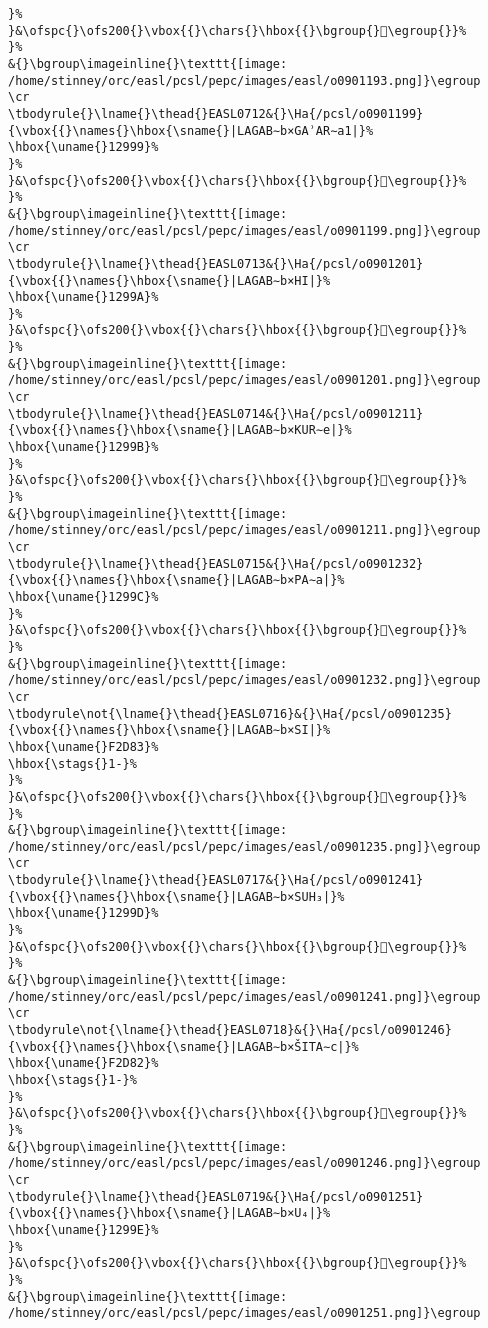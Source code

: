 \begin{verbatim}
}%
}&\ofspc{}\ofs200{}\vbox{{}\chars{}\hbox{{}\bgroup{}𒦘\egroup{}}%
}%
&{}\bgroup\imageinline{}\texttt{[image: /home/stinney/orc/easl/pcsl/pepc/images/easl/o0901193.png]}\egroup
\cr
\tbodyrule{}\lname{}\thead{}EASL0712&{}\Ha{/pcsl/o0901199}{\vbox{{}\names{}\hbox{\sname{}|LAGAB∼b×GAʾAR∼a1|}%
\hbox{\uname{}12999}%
}%
}&\ofspc{}\ofs200{}\vbox{{}\chars{}\hbox{{}\bgroup{}𒦙\egroup{}}%
}%
&{}\bgroup\imageinline{}\texttt{[image: /home/stinney/orc/easl/pcsl/pepc/images/easl/o0901199.png]}\egroup
\cr
\tbodyrule{}\lname{}\thead{}EASL0713&{}\Ha{/pcsl/o0901201}{\vbox{{}\names{}\hbox{\sname{}|LAGAB∼b×HI|}%
\hbox{\uname{}1299A}%
}%
}&\ofspc{}\ofs200{}\vbox{{}\chars{}\hbox{{}\bgroup{}𒦚\egroup{}}%
}%
&{}\bgroup\imageinline{}\texttt{[image: /home/stinney/orc/easl/pcsl/pepc/images/easl/o0901201.png]}\egroup
\cr
\tbodyrule{}\lname{}\thead{}EASL0714&{}\Ha{/pcsl/o0901211}{\vbox{{}\names{}\hbox{\sname{}|LAGAB∼b×KUR∼e|}%
\hbox{\uname{}1299B}%
}%
}&\ofspc{}\ofs200{}\vbox{{}\chars{}\hbox{{}\bgroup{}𒦛\egroup{}}%
}%
&{}\bgroup\imageinline{}\texttt{[image: /home/stinney/orc/easl/pcsl/pepc/images/easl/o0901211.png]}\egroup
\cr
\tbodyrule{}\lname{}\thead{}EASL0715&{}\Ha{/pcsl/o0901232}{\vbox{{}\names{}\hbox{\sname{}|LAGAB∼b×PA∼a|}%
\hbox{\uname{}1299C}%
}%
}&\ofspc{}\ofs200{}\vbox{{}\chars{}\hbox{{}\bgroup{}𒦜\egroup{}}%
}%
&{}\bgroup\imageinline{}\texttt{[image: /home/stinney/orc/easl/pcsl/pepc/images/easl/o0901232.png]}\egroup
\cr
\tbodyrule\not{\lname{}\thead{}EASL0716}&{}\Ha{/pcsl/o0901235}{\vbox{{}\names{}\hbox{\sname{}|LAGAB∼b×SI|}%
\hbox{\uname{}F2D83}%
\hbox{\stags{}1-}%
}%
}&\ofspc{}\ofs200{}\vbox{{}\chars{}\hbox{{}\bgroup{}󲶃\egroup{}}%
}%
&{}\bgroup\imageinline{}\texttt{[image: /home/stinney/orc/easl/pcsl/pepc/images/easl/o0901235.png]}\egroup
\cr
\tbodyrule{}\lname{}\thead{}EASL0717&{}\Ha{/pcsl/o0901241}{\vbox{{}\names{}\hbox{\sname{}|LAGAB∼b×SUH₃|}%
\hbox{\uname{}1299D}%
}%
}&\ofspc{}\ofs200{}\vbox{{}\chars{}\hbox{{}\bgroup{}𒦝\egroup{}}%
}%
&{}\bgroup\imageinline{}\texttt{[image: /home/stinney/orc/easl/pcsl/pepc/images/easl/o0901241.png]}\egroup
\cr
\tbodyrule\not{\lname{}\thead{}EASL0718}&{}\Ha{/pcsl/o0901246}{\vbox{{}\names{}\hbox{\sname{}|LAGAB∼b×ŠITA∼c|}%
\hbox{\uname{}F2D82}%
\hbox{\stags{}1-}%
}%
}&\ofspc{}\ofs200{}\vbox{{}\chars{}\hbox{{}\bgroup{}󲶂\egroup{}}%
}%
&{}\bgroup\imageinline{}\texttt{[image: /home/stinney/orc/easl/pcsl/pepc/images/easl/o0901246.png]}\egroup
\cr
\tbodyrule{}\lname{}\thead{}EASL0719&{}\Ha{/pcsl/o0901251}{\vbox{{}\names{}\hbox{\sname{}|LAGAB∼b×U₄|}%
\hbox{\uname{}1299E}%
}%
}&\ofspc{}\ofs200{}\vbox{{}\chars{}\hbox{{}\bgroup{}𒦞\egroup{}}%
}%
&{}\bgroup\imageinline{}\texttt{[image: /home/stinney/orc/easl/pcsl/pepc/images/easl/o0901251.png]}\egroup

\end{verbatim}
